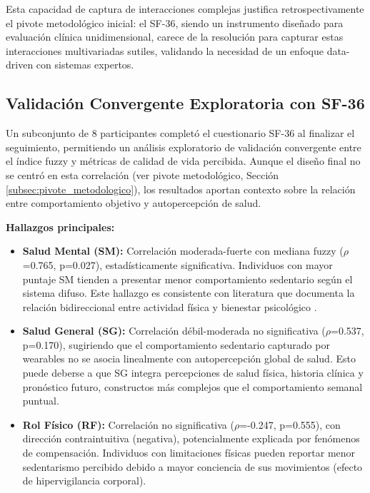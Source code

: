 Esta capacidad de captura de interacciones complejas justifica retrospectivamente el pivote metodológico inicial: el SF-36, siendo un instrumento diseñado para evaluación clínica unidimensional, carece de la resolución para capturar estas interacciones multivariadas sutiles, validando la necesidad de un enfoque data-driven con sistemas expertos.

\subsection{Validación Convergente Exploratoria con SF-36}
\label{subsec:sf36_exploratorio}

Un subconjunto de 8 participantes completó el cuestionario SF-36 al finalizar el seguimiento, permitiendo un análisis exploratorio de validación convergente entre el índice fuzzy y métricas de calidad de vida percibida. Aunque el diseño final no se centró en esta correlación (ver pivote metodológico, Sección \ref{subsec:pivote_metodologico}), los resultados aportan contexto sobre la relación entre comportamiento objetivo y autopercepción de salud.

\textbf{Hallazgos principales:}
\begin{itemize}
    \item \textbf{Salud Mental (SM):} Correlación moderada-fuerte con mediana fuzzy ($\rho$=0.765, p=0.027), estadísticamente significativa. Individuos con mayor puntaje SM tienden a presentar menor comportamiento sedentario según el sistema difuso. Este hallazgo es consistente con literatura que documenta la relación bidireccional entre actividad física y bienestar psicológico \cite{Schuch2018}.
    
    \item \textbf{Salud General (SG):} Correlación débil-moderada no significativa ($\rho$=0.537, p=0.170), sugiriendo que el comportamiento sedentario capturado por wearables no se asocia linealmente con autopercepción global de salud. Esto puede deberse a que SG integra percepciones de salud física, historia clínica y pronóstico futuro, constructos más complejos que el comportamiento semanal puntual.
    
    \item \textbf{Rol Físico (RF):} Correlación no significativa ($\rho$=-0.247, p=0.555), con dirección contraintuitiva (negativa), potencialmente explicada por fenómenos de compensación. Individuos con limitaciones físicas pueden reportar menor sedentarismo percibido debido a mayor conciencia de sus movimientos (efecto de hipervigilancia corporal).
\end{itemize}

